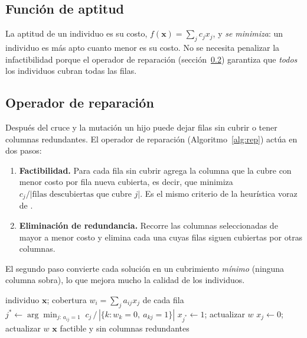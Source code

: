 \documentclass[11pt,a4paper]{article}
\begin{document}
\subsection{Función de aptitud}
La aptitud de un individuo es su costo, $f(\mathbf{x})=\sum_j c_j x_j$, y \emph{se minimiza}: un
individuo es más apto cuanto menor es su costo. No se necesita penalizar la infactibilidad porque
el operador de reparación (sección~\ref{sec:rep}) garantiza que \emph{todos} los individuos cubran
todas las filas.

\subsection{Operador de reparación}\label{sec:rep}
Después del cruce y la mutación un hijo puede dejar filas sin cubrir o tener columnas redundantes.
El operador de reparación (Algoritmo~\ref{alg:rep}) actúa en dos pasos:
\begin{enumerate}[nosep]
  \item \textbf{Factibilidad.} Para cada fila sin cubrir agrega la columna que la cubre con menor
  costo por fila nueva cubierta, es decir, que minimiza $c_j / |\text{filas descubiertas que cubre } j|$.
  Es el mismo criterio de la heurística voraz de \citet{chvatal1979}.
  \item \textbf{Eliminación de redundancia.} Recorre las columnas seleccionadas de mayor a menor
  costo y elimina cada una cuyas filas siguen cubiertas por otras columnas.
\end{enumerate}
El segundo paso convierte cada solución en un cubrimiento \emph{mínimo} (ninguna columna sobra),
lo que mejora mucho la calidad de los individuos.

\begin{algorithm}[H]
\caption{Operador de reparación}\label{alg:rep}
\begin{algorithmic}[1]
\Require individuo $\mathbf{x}$; cobertura $w_i=\sum_j a_{ij}x_j$ de cada fila
  \State $j^\ast \gets \arg\min_{j:\,a_{ij}=1} \; c_j \,/\, |\{k: w_k=0,\ a_{kj}=1\}|$
  \State $x_{j^\ast}\gets 1$; actualizar $w$
\EndFor
{}
     \State $x_j\gets 0$; actualizar $w$ 
  \EndIf
\EndFor
\Ensure $\mathbf{x}$ factible y sin columnas redundantes
\end{algorithmic}
\end{algorithm}
\end{document}
